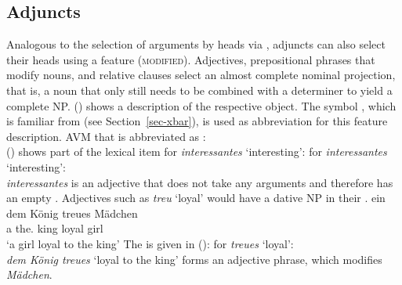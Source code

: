 \subsection{Adjuncts}
\label{Abschnitt-HPSG-Adjunkte}\label{sec-adjuncts-hpsg}

Analogous to the selection of arguments by heads via \subcat, adjuncts can also select their heads using a feature (\textsc{modified}).
Adjectives, prepositional phrases that modify nouns, and relative clauses select an almost complete nominal projection, that is, a noun that only still needs to
be combined with a determiner to yield a complete NP. () shows a description of the respective 
object. The symbol \nbar, which is familiar from \xbart (see Section~\ref{sec-xbar}), is used as abbreviation
for this feature description.
\ea
AVM that is abbreviated as \nbar:\\
\z
() shows part of the lexical item for \emph{interessantes} `interesting':
\eas{}
\label{le-interessantes}
\catv for \emph{interessantes} `interesting':\\
\zs
\emph{interessantes} is an adjective that does not take any arguments and therefore has an empty \subcatl. Adjectives such as \emph{treu} `loyal' would
have a dative NP in their \subcatl.
\ea
\gll ein dem König treues Mädchen\\
	a the.\dat{} king loyal girl\\
\glt `a girl loyal to the king'
\z
The \catv is given in ():
\ea
\label{le-treue}
\catv for \emph{treues} `loyal':\\
\z
\emph{dem König treues} `loyal to the king' forms an adjective phrase, which modifies \emph{Mädchen}.

